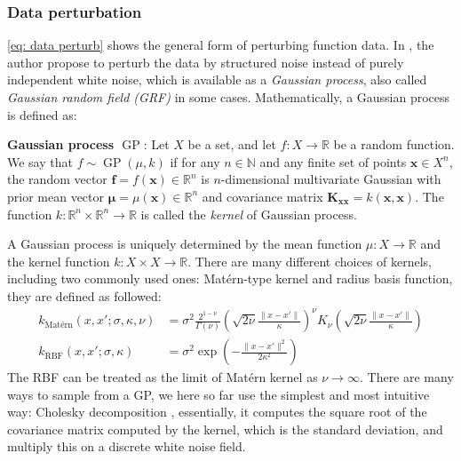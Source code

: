 \documentclass{article}
\begin{document}
\subsubsection{Data perturbation}
\ref{eq: data perturb} shows the general form of perturbing function data. In \cite{lim2023scorebased}, the author propose to perturb the data by structured noise instead of purely independent white noise, which is available as a \emph{Gaussian process}, also called \emph{Gaussian random field (GRF)} in some cases. Mathematically, a Gaussian process is defined as:
\begin{theorem}
    \noindent\textbf{Gaussian process $\operatorname{GP}$}: Let $X$ be a set, and let $f:X\to\mathbb{R}$ be a random function. We say that $f\sim\operatorname{GP}(\mu, k)$ if for any $n\in\mathbb{N}$ and any finite set of points $\mathbf{x}\in X^n$, the random vector $\mathbf{f}=f(\mathbf{x})\in\mathbb{R}^n$ is $n$-dimensional multivariate Gaussian with prior mean vector $\mathbf{\mu}=\mu(\mathbf{x})\in\mathbb{R}^n$ and covariance matrix $\mathbf{K}_{\mathbf{xx}} = k(\mathbf{x}, \mathbf{x})$. The function $k:\mathbb{R}^n\times\mathbb{R}^n\to\mathbb{R}$ is called the \emph{kernel} of Gaussian process.
\end{theorem}
A Gaussian process is uniquely determined by the mean function $\mu:X\to\mathbb{R}$ and the kernel function $k:X\times X\to\mathbb{R}$. There are many different choices of kernels, including two commonly used ones: Matérn-type kernel and radius basis function, they are defined as followed:
\begin{align}
    k_{\text{Matérn}}(x, x';\sigma, \kappa, \nu) &= \sigma^2\frac{2^{1-\nu}}{\Gamma(\nu)}\left(\sqrt{2\nu}\frac{\| x-x' \|}{\kappa}\right)^\nu K_{\nu}\left(\sqrt{2\nu}\frac{\| x-x' \|}{\kappa}\right) \\
    k_{\text{RBF}}(x, x';\sigma, \kappa) &= \sigma^2\exp\left(-\frac{\| x - x' \|^2}{2\kappa^2}\right)
\end{align}
The RBF can be treated as the limit of Matérn kernel as $\nu\to\infty$. There are many ways to sample from a GP, we here so far use the simplest and most intuitive way: Cholesky decomposition , essentially, it computes the square root of the covariance matrix computed by the kernel, which is the standard deviation, and multiply this on a discrete white noise field.
\end{document}
